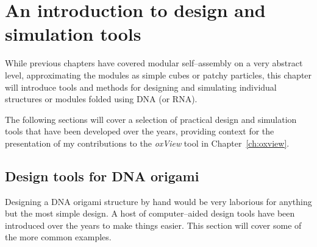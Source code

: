 
\chapter{An introduction to design and simulation tools}
\label{ch:oxview_intro}

\minitoc

While previous chapters have covered modular self--assembly on a very abstract level, approximating the modules as simple cubes or patchy particles, this chapter will introduce tools and methods for designing and simulating individual structures or modules folded using DNA (or RNA).

The following sections will cover a selection of practical design and simulation tools that have been developed over the years, providing context for the presentation of my contributions to the \emph{oxView} tool in Chapter~\ref{ch:oxview}.







\section{Design tools for DNA origami}\label{sec:design_tools}
Designing a DNA origami structure by hand would be very laborious for anything but the most simple design. A host of computer--aided design tools have been introduced over the years to make things easier. This section will cover some of the more common examples.

